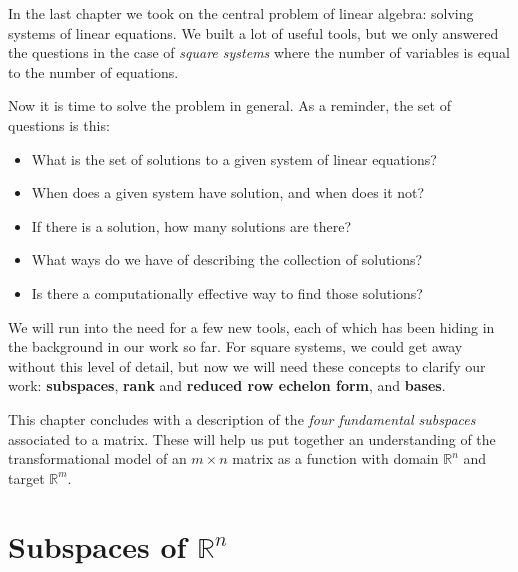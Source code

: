 \documentclass[10pt,]{book}
\newcommand{\terminology}[1]{\textbf{#1}}
\theoremstyle{plain}
\theoremstyle{definition}
\numberwithin{equation}{section}
\begin{document}
      In the last chapter we took on the central problem of linear algebra: solving
      systems of linear equations. We built a lot of useful tools, but we only
      answered the questions in the case of \emph{square systems} where the
      number of variables is equal to the number of equations.
\par

      Now it is time to solve the problem in general. As a reminder, the set of
      questions is this:
\begin{itemize}
\item{}
        What is the set of solutions to a given system of linear equations?
      \item{}
        When does a given system have solution, and when does it not?
      \item{}
        If there is a solution, how many solutions are there?
      \item{}
        What ways do we have of describing the collection of solutions?
      \item{}
        Is there a computationally effective way to find those solutions?
      \end{itemize}
\par

      We will run into the need for a few new tools, each of which has been
      hiding in the background in our work so far. For square systems, we could
      get away without this level of detail, but now we will need these concepts
      to clarify our work: \terminology{subspaces}, \terminology{rank} and
      \terminology{reduced row echelon form}, and \terminology{bases}.
\par

      This chapter concludes with a description of the \emph{four fundamental subspaces}
      associated to a matrix. These will help us put together an understanding of
      the transformational model of an \(m\times n\) matrix as a function with
      domain \(\mathbb{R}^n\) and target \(\mathbb{R}^m\).
\typeout{************************************************}
\typeout{************************************************}
\section[Subspaces of \(\mathbb{R}^n\)]{Subspaces of \(\mathbb{R}^n\)}\label{vector-spaces}
\typeout{************************************************}
\typeout{************************************************}
\end{document}
